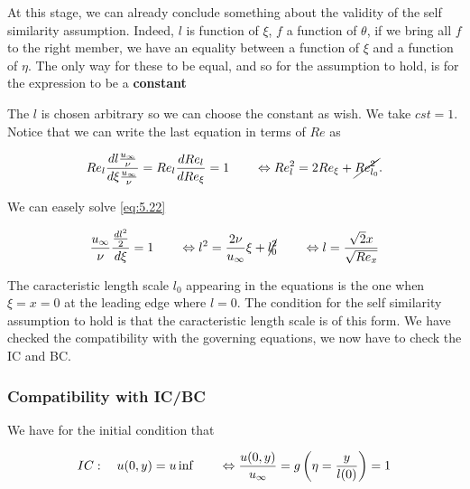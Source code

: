 			At this stage, we can already conclude something about the validity of the self similarity assumption. Indeed, $l$ is function of $\xi$, $f$ a function of $\theta$, if we bring all $f$ to the right member, we have an equality between a function of $\xi$ and a function of $\eta$. The only way for these to be equal, and so for the assumption to hold, is for the expression to be a \textbf{constant}
			
			\begin{center}
			\end{center}
			
			The $l$ is chosen arbitrary so we can choose the constant as wish. We take $cst = 1$. Notice that we can write the last equation in terms of $Re$ as 
			
			\begin{equation}
				Re_l \frac{dl \frac{u_\infty}{\nu}}{d\xi \frac{u_\infty}{\nu}} = Re_l \frac{dRe_l}{dRe_\xi} = 1 \qquad \Leftrightarrow Re_l^2 = 2 Re_\xi + \cancel{Re_{l_0}^2}.
				\label{eq:5.23}
			\end{equation}
			
			We can easely solve \eqref{eq:5.22}
			
			\begin{equation}
				\frac{u_\infty}{\nu}\frac{\frac{dl^2}{2}}{d\xi} = 1 \qquad \Leftrightarrow l^2 = \frac{2\nu}{u_\infty} \xi + \cancel{l_0^2} \qquad \Leftrightarrow l = \frac{\sqrt{2}x}{\sqrt{Re_x}}
			\end{equation}
			
			The caracteristic length scale $l_0$ appearing in the equations is the one when $\xi = x = 0$ at the leading edge where $l = 0$. The condition for the self similarity assumption to hold is that the caracteristic length scale is of this form. We have checked the compatibility with the governing equations, we now have to check the IC and BC. 
			
		\subsubsection{Compatibility with IC/BC}
			We have for the initial condition that
			
			\begin{equation}
				IC: \quad u(0,y) = u\inf \qquad \Leftrightarrow \frac{u(0,y)}{u_\infty} = g\left(\eta = \frac{y}{l(0)}\right)=1
			\end{equation}
			
